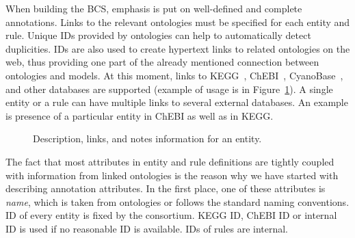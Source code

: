 \documentclass[12pt, twoside]{fithesis2} %
\begin{document}
When building the BCS, emphasis is put on well-defined and complete annotations. Links to the relevant ontologies must be specified for each entity and rule. Unique IDs provided by ontologies can help to automatically detect duplicities. IDs are also used to create hypertext links to related ontologies on the web, thus providing one part of the already mentioned connection between ontologies and models. At this moment, links to KEGG~\cite{Kanehisa04012016}, ChEBI~\cite{ChEBI}, CyanoBase~\cite{CyanoBase}, and other databases are supported (example of usage is in Figure~\ref{database_links}). A single entity or a rule can have multiple links to several external databases. An example is presence of a particular entity in ChEBI as well as in KEGG.

\begin{figure}[!h]
\begin{center}
\end{center}
\caption{Description, links, and notes information for an entity.}\label{database_links}
\end{figure}

The fact that most attributes in entity and rule definitions are tightly coupled with information from linked ontologies is the reason why we have started with describing annotation attributes. In the first place, one of these attributes is \emph{name}, which is taken from ontologies or follows the standard naming conventions. ID of every entity is fixed by the consortium. KEGG ID, ChEBI ID or internal ID is used if no reasonable ID is available. IDs of rules are internal.
\end{document}
